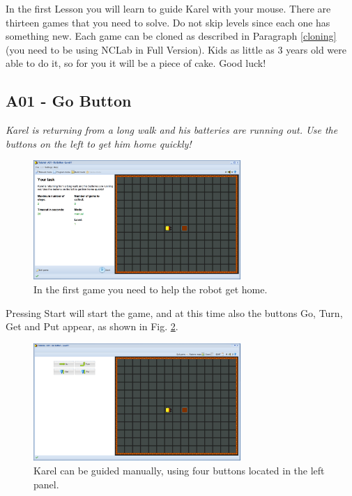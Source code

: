\documentclass[article,A4,12pt]{llncs}
\begin{document}
In the first Lesson you will learn to guide Karel with your mouse.
There are thirteen games that you need to 
solve. Do not skip levels since each one has something new. Each game can 
be cloned as described in Paragraph \ref{cloning} (you need to be using NCLab in Full Version). 
Kids as little as 3 years old were able to do it, so for you it will be a piece 
of cake. Good luck!

\newpage

\subsection{A01 - Go Button}

{\em Karel is returning from a long walk and his batteries are running out. 
Use the buttons on the left to get him home quickly! }

\begin{figure}[!ht]
\begin{center}
\includegraphics[width=0.7\textwidth]{img/a01.png}
\end{center}
\vspace{-4mm}
\caption{In the first game you need to help the robot get home.}
\label{fig:a01}
\end{figure}
\noindent
Pressing Start will start 
the game, and at this time also the buttons Go, Turn, Get and Put appear, 
as shown in Fig. \ref{fig:a01b}.

\begin{figure}[!ht]
\begin{center}
\includegraphics[width=0.7\textwidth]{img/a01b.png}
\end{center}
\vspace{-4mm}
\caption{Karel can be guided manually, using four buttons located in the left panel.}
\label{fig:a01b}
\end{figure}
\end{document}
